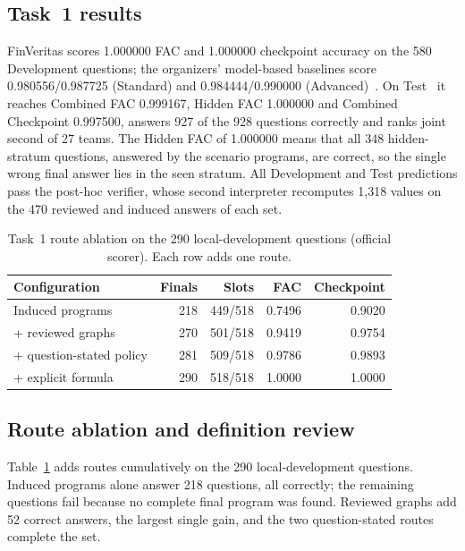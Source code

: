\documentclass[conference]{IEEEtran}
\begin{document}
\subsection{Task~1 results}
\label{sec:t1results}
FinVeritas scores 1.000000 FAC and 1.000000 checkpoint accuracy on the 580 Development questions; the organizers' model-based baselines score 0.980556/0.987725 (Standard) and 0.984444/0.990000 (Advanced)~\cite{cupterms,task1dev}. On Test~\cite{task1results} it reaches Combined FAC 0.999167, Hidden FAC 1.000000 and Combined Checkpoint 0.997500, answers 927 of the 928 questions correctly and ranks joint second of 27 teams. The Hidden FAC of 1.000000 means that all 348 hidden-stratum questions, answered by the scenario programs, are correct, so the single wrong final answer lies in the seen stratum. All Development and Test predictions pass the post-hoc verifier, whose second interpreter recomputes 1,318 values on the 470 reviewed and induced answers of each set.

\begin{table}[t]
\caption{Task~1 route ablation on the 290 local-development questions (official scorer). Each row adds one route.}
\label{tab:ablation}
\centering\footnotesize
\setlength{\tabcolsep}{3.5pt}
\begin{tabular}{@{}lrrrr@{}}
\toprule
Configuration & Finals & Slots & FAC & Checkpoint\\
\midrule
Induced programs & 218 & 449/518 & 0.7496 & 0.9020\\
+ reviewed graphs & 270 & 501/518 & 0.9419 & 0.9754\\
+ question-stated policy & 281 & 509/518 & 0.9786 & 0.9893\\
+ explicit formula & 290 & 518/518 & 1.0000 & 1.0000\\
\bottomrule
\end{tabular}
\end{table}

\subsection{Route ablation and definition review}
\label{sec:reviewed}
Table~\ref{tab:ablation} adds routes cumulatively on the 290 local-development questions. Induced programs alone answer 218 questions, all correctly; the remaining questions fail because no complete final program was found. Reviewed graphs add 52 correct answers, the largest single gain, and the two question-stated routes complete the set.
\end{document}
